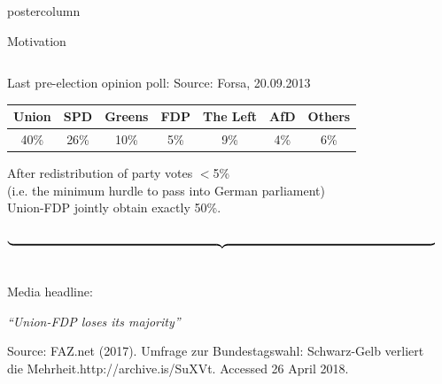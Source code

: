 \documentclass[final,hyperref={pdfpagelabels=false}]{beamer}
\newcommand{\blue}[1]{\textcolor{koaladarkestblue}{#1}}
\newcommand{\darkgray}[1]{\textcolor{koaladarkgray}{#1}}
\newcommand{\lightgray}[1]{\textcolor{koalagray}{#1}}
\begin{document}
\begin{frame}
\begin{columns}
\begin{column}{1\textwidth}
\begin{beamercolorbox}[center,wd=\textwidth]{postercolumn}
\begin{minipage}[T]{.95\textwidth}
\begin{block}{\footnotesize Motivation}
{{\begin{minipage}{0.94\textwidth}
\begin{columns}[t]
  \begin{column}{.28\textwidth}
  \darkgray{Last pre-election opinion poll:} \lightgray{\tiny Source: Forsa, 20.09.2013}
  \\[2.5ex]
  \begin{center}
  \begin{tabular}{ccccccc}
  \toprule
  \darkgray{Union} & {\footnotesize \lightgray{SPD}} & {\footnotesize \lightgray{Greens}} & \darkgray{FDP} & {\footnotesize \lightgray{The Left}} & {\footnotesize \lightgray{AfD}} & {\footnotesize \lightgray{Others}} \\ \midrule
  \darkgray{40\%} & {\footnotesize \lightgray{26\%}} & {\footnotesize \lightgray{10\%}} & \darkgray{5\%} & {\footnotesize \lightgray{9\%}} & {\footnotesize \lightgray{4\%}} & {\footnotesize \lightgray{6\%}} \\
  \bottomrule
  \end{tabular}
  \end{center}
  \vspace{1.5ex}
  \begin{center}
  \darkgray{After redistribution} \lightgray{\footnotesize of party votes $<$5\% \\ (i.e. the minimum hurdle to pass into German parliament)} \\
  \darkgray{Union-FDP} \lightgray{\footnotesize jointly} \darkgray{obtain} \lightgray{\footnotesize exactly} \darkgray{50\%}.
  \end{center}
  \vspace{-3ex}
  \textcolor{koalablue}{$$ \underbrace{\resizebox{\hsize}{!}{ }}_{ } $$}
  \ \\ \vspace{-2ex}
  \lightgray{\footnotesize Media headline:}
  \begin{center}
  \darkgray{\textit{\normalsize ``Union-FDP loses its majority''}}
  \end{center}
  \vspace{1ex}
  \lightgray{\tiny Source: FAZ.net (2017). Umfrage zur Bundestagswahl: Schwarz-Gelb verliert \\[-2ex]
  die Mehrheit.http://archive.is/SuXVt. Accessed 26 April 2018.}
  \end{column}

  \begin{column}{.025\textwidth}
  \hspace{10ex}
  \huge{\blue{}}
  \end{column}


\end{columns}
\end{minipage}}}
\end{block}
\end{minipage}
\end{beamercolorbox}
\end{column}
\end{columns}
\end{frame}
\end{document}
